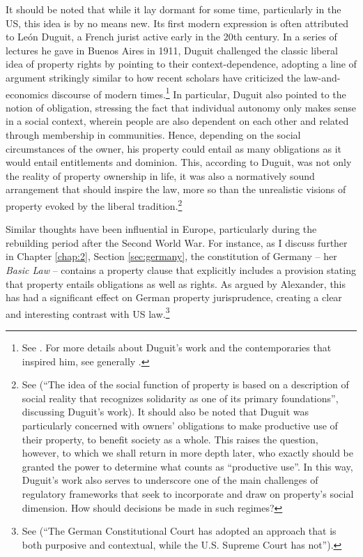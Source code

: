 It should be noted that while it lay dormant for some time, particularly in the US, this idea is by no means new. Its first modern expression is often attributed to Le{\'o}n Duguit, a French jurist active early in the 20th century. In a series of lectures he gave in Buenos Aires in 1911, Duguit challenged the classic liberal idea of property rights by pointing to their context-dependence, adopting a line of argument strikingly similar to how recent scholars have criticized the law-and-economics discourse of modern times.\footnote{See \cite[1004-1008]{foster11}. For more details about Duguit's work and the contemporaries that inspired him, see generally \cite{mirow10}.} In particular, Duguit also pointed to the notion of obligation, stressing the fact that individual autonomy only makes sense in a social context, wherein people are also dependent on each other and related through membership in communities. Hence, depending on the social circumstances of the owner, his property could entail as many obligations as it would entail entitlements and dominion. This, according to Duguit, was not only the reality of property ownership in life, it was also a normatively sound arrangement that should inspire the law, more so than the unrealistic visions of property evoked by the liberal tradition.\footnote{See \cite[1005]{foster11} (``The idea of the social function of property is based on a description of social reality that recognizes solidarity as one of its primary foundations'', discussing Duguit's work). It should also be noted that Duguit was particularly concerned with owners' obligations to make productive use of their property, to benefit society as a whole. This raises the question, however, to which we shall return in more depth later, who exactly should be granted the power to determine what counts as ``productive use''. In this way, Duguit's work also serves to underscore one of the main challenges of regulatory frameworks that seek to incorporate and draw on property's social dimension. How should decisions be made in such regimes?} 

Similar thoughts have been influential in Europe, particularly during the rebuilding period after the Second World War. For instance, as I discuss further in Chapter \ref{chap:2}, Section \ref{sec:germany}, the constitution of Germany -- her {\it Basic Law} -- contains a property clause that explicitly includes a provision stating that property entails obligations as well as rights. As argued by Alexander, this has had a significant effect on German property jurisprudence, creating a clear and interesting contrast with US law.\footnote{See \cite[338]{alexander03} (``The German Constitutional Court has adopted an approach that is both purposive and contextual, while the U.S. Supreme Court has not'').} 

